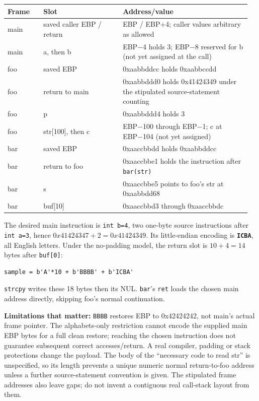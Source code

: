 \documentclass[11pt,a4paper]{article}
\begin{document}
{\small\setlength{\tabcolsep}{3pt}
\begin{longtable}{>{\raggedright\arraybackslash}p{0.14009\linewidth}>{\raggedright\arraybackslash}p{0.31324\linewidth}>{\raggedright\arraybackslash}p{0.50509\linewidth}}
\toprule
\textbf{Frame} & \textbf{Slot} & \textbf{Address/\allowbreak{}value} \\
\midrule
\endhead
main & saved caller EBP /\allowbreak{} return & EBP /\allowbreak{} EBP+4; caller values arbitrary as allowed \\
main & a,\allowbreak{} then b & EBP−4 holds 3; EBP−8 reserved for b (not yet assigned at the call) \\
foo & saved EBP & 0xaabbddcc holds 0xaabbccdd \\
foo & return to main & 0xaabbddd0 holds 0x41424349 under the stipulated source-statement counting \\
foo & p & 0xaabbddd4 holds 3 \\
foo & str[100],\allowbreak{} then c & EBP−100 through EBP−1; c at EBP−104 (not yet assigned) \\
bar & saved EBP & 0xaaccbbdd holds 0xaabbddcc \\
bar & return to foo & 0xaaccbbe1 holds the instruction after \texttt{bar(str)} \\
bar & s & 0xaaccbbe5 points to foo's str at 0xaabbdd68 \\
bar & buf[10] & 0xaaccbbd3 through 0xaaccbbdc \\
\bottomrule
\end{longtable}
}

The desired main instruction is \texttt{int b=\allowbreak{}4},\allowbreak{} two one-byte source instructions after \texttt{int a=\allowbreak{}3},\allowbreak{} hence \(0x41424347+2=0x41424349\). Its little-endian encoding is \textbf{\texttt{ICBA}},\allowbreak{} all English letters. Under the no-padding model,\allowbreak{} the return slot is \(10+4=14\) bytes after \texttt{buf[0]}:



\begin{Verbatim}[breaklines=true,breakanywhere=true,fontsize=\small,frame=single,rulecolor=\color{PanelBorder}]
sample = b'A'*10 + b'BBBB' + b'ICBA'
\end{Verbatim}

\texttt{strcpy} writes these 18 bytes then its NUL. \texttt{bar}'s \texttt{ret} loads the chosen main address directly,\allowbreak{} skipping foo's normal continuation.


\textbf{Limitations that matter:} \texttt{BBBB} restores EBP to 0x42424242,\allowbreak{} not main's actual frame pointer. The alphabets-only restriction cannot encode the supplied main EBP bytes for a full clean restore; reaching the chosen instruction does not guarantee subsequent correct accesses/\allowbreak{}return. A real compiler,\allowbreak{} padding or stack protections change the payload. The body of the “necessary code to read str” is unspecified,\allowbreak{} so its length prevents a unique numeric normal return-to-foo address unless a further source-statement convention is given. The stipulated frame addresses also leave gaps; do not invent a contiguous real call-stack layout from them.
\end{document}
